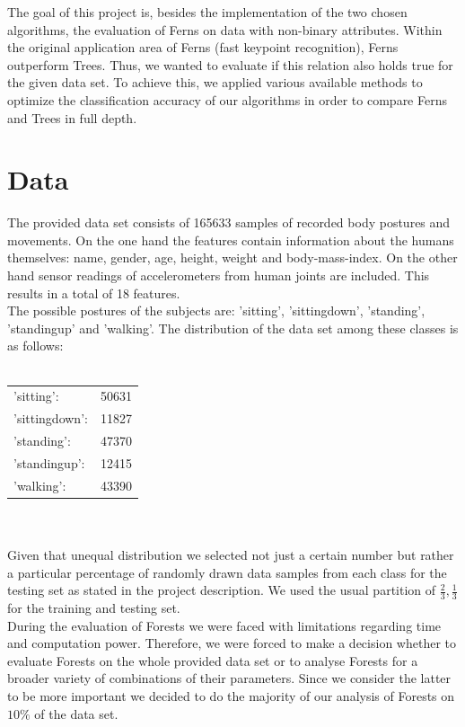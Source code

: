 \documentclass[twocolumn]{article}
\begin{document}
The goal of this project is, besides the implementation of the two chosen algorithms, the evaluation of Ferns on data with non-binary attributes. Within the original application area of Ferns (fast keypoint recognition), Ferns outperform Trees. Thus, we wanted to evaluate if this relation also holds true for the given data set. To achieve this, we applied various available methods to optimize the classification accuracy of our algorithms in order to compare Ferns and Trees in full depth.


\section{Data}
The provided data set consists of 165633 samples of recorded body postures and movements. On the one hand the features contain information about the humans themselves: name, gender, age, height, weight and body-mass-index. On the other hand sensor readings of accelerometers from human joints are included. This results in a total of 18 features.\\
The possible postures of the subjects are: 'sitting', 'sittingdown', 'standing', 'standingup' and 'walking'. The distribution of the data set among these classes is as follows:\\\\
\begin{tabular}{p{2cm}p{2cm}}
'sitting': & 50631\\
'sittingdown': & 11827\\
'standing': & 47370\\
'standingup': & 12415\\
'walking': & 43390
\end{tabular}\\\\
Given that unequal distribution we selected not just a certain number but rather a particular percentage of randomly drawn data samples from each class for the testing set as stated in the project description. We used the usual partition of $\frac{2}{3}, \frac{1}{3}$ for the training and testing set.\\
During the evaluation of Forests we were faced with limitations regarding time and computation power. Therefore, we were forced to make a decision whether to evaluate Forests on the whole provided data set or to analyse Forests for a broader variety of combinations of their parameters. Since we consider the latter to be more important we decided to do the majority of our analysis of Forests on $10\%$ of the data set.
\end{document}
